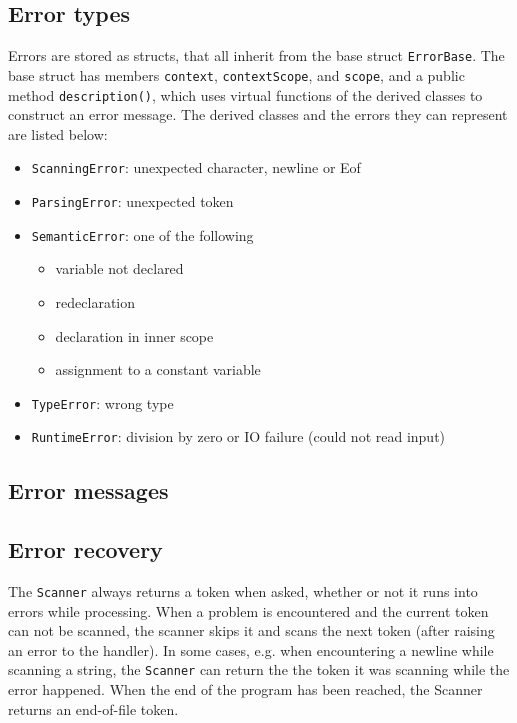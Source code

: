 \documentclass[a4paper]{article}
\newcommand*{\code}[1]{\texttt{#1}}
\begin{document}
\subsection{Error types}

Errors are stored as structs, that all inherit from the 
base struct \code{ErrorBase}. The base struct has members 
\code{context}, \code{contextScope}, and \code{scope}, 
and a public method \code{description()}, which uses 
virtual functions of the derived classes to construct an 
error message. The derived classes and the errors they 
can represent are listed below:
\begin{itemize}
  \item \code{ScanningError}: unexpected character, newline or Eof
  \item \code{ParsingError}: unexpected token
  \item \code{SemanticError}: one of the following
  \begin{itemize}
    \item variable not declared
    \item redeclaration
    \item declaration in inner scope
    \item assignment to a constant variable
  \end{itemize}
  \item \code{TypeError}: wrong type
  \item \code{RuntimeError}: division by zero or IO failure (could not read input)
\end{itemize}

\subsection{Error messages}

\subsection{Error recovery}

The \code{Scanner} always returns a token when asked, whether or 
not it runs into errors while processing. When a problem is 
encountered and the current token can not be scanned, the scanner 
skips it and scans the next token (after raising an error to the 
handler). In some cases, e.g. when encountering a newline while 
scanning a string, the \code{Scanner} can return the the token it 
was scanning while the error happened. When the end of the 
program has been reached, the Scanner returns an end-of-file token.
\end{document}
